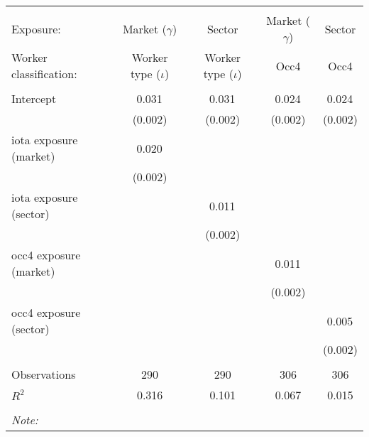 \begin{tabular}{@{\extracolsep{5pt}}lcccc}
\\[-1.8ex]\hline
\hline \\[-1.8ex]
\hline \\[-1.8ex]
 Exposure: & Market ($\gamma$) & Sector & Market ($\gamma$) & Sector \\
 Worker classification: & Worker type ($\iota$) & Worker type ($\iota$) & Occ4 & Occ4 \\
 \hline &  &  &  &  \\
 Intercept & 0.031$^{}$ & 0.031$^{}$ & 0.024$^{}$ & 0.024$^{}$ \\
  & (0.002) & (0.002) & (0.002) & (0.002) \\
 iota exposure (market) & 0.020$^{}$ & & & \\
  & (0.002) & & & \\
 iota exposure (sector) & & 0.011$^{}$ & & \\
  & & (0.002) & & \\
 occ4 exposure (market) & & & 0.011$^{}$ & \\
  & & & (0.002) & \\
 occ4 exposure (sector) & & & & 0.005$^{}$ \\
  & & & & (0.002) \\
\hline \\[-1.8ex]
 Observations & 290 & 290 & 306 & 306 \\
 $R^2$ & 0.316 & 0.101 & 0.067 & 0.015 \\
\hline
\hline \\[-1.8ex]
\textit{Note:}\end{tabular}
